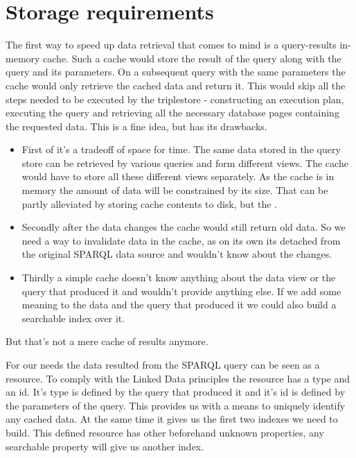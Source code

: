 \section{Storage requirements}
\label{sec:StorageRequirements}
The first way to speed up data retrieval that comes to mind is a query-results in-memory cache. Such a cache would store the result of the query along with the query and its parameters. On a subsequent query with the same parameters the cache would only retrieve the cached data and return it. This would skip all the steps needed to be executed by the triplestore - constructing an execution plan, executing the query and retrieving all the necessary database pages containing the requested data. This is a fine idea, but has its drawbacks.
\begin{itemize}
	\item First of it's a tradeoff of space for time. The same data stored in the query store can be retrieved by various queries and form different views. The cache would have to store all these different views separately. As the cache is in memory the amount of data will be constrained by its size. That can be partly alleviated by storing cache contents to disk, but the .
	\item Secondly after the data changes the cache would still return old data. So we need a way to invalidate data in the cache, as on its own its detached from the original SPARQL data source and wouldn't know about the changes.
	\item Thirdly a simple cache doesn't know anything about the data view or the query that produced it and wouldn't provide anything else. If we add some meaning to the data and the query that produced it we could also build a searchable index over it.
\end{itemize}
But that's not a mere cache of results anymore.

For our needs the data resulted from the SPARQL query can be seen as a resource. To comply with the Linked Data principles the resource has a type and an id. It's type is defined by the query that produced it and it's id is defined by the parameters of the query. This provides us with a means to uniquely identify any cached data. At the same time it gives us the first two indexes we need to build. This defined resource has other beforehand unknown properties, any searchable property will give us another index.

